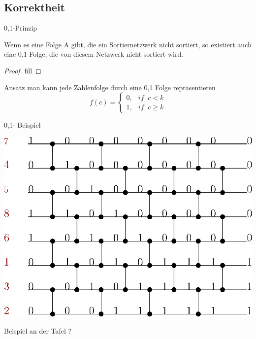 \documentclass[ucs,9pt]{beamer}
\begin{document}
\subsection{Korrektheit}
\begin{frame}{0,1-Prinzip}
\begin{theorem} 
Wenn es eine Folge A gibt, die ein Sortiernetzwerk nicht sortiert, so existiert auch eine 0,1-Folge, die von diesem Netzwerk nicht sortiert wird.
\end{theorem}
\begin{proof}
{\color{red} fill}
\end{proof}
\end{frame}

\begin{frame}{Ansatz}
    man kann jede Zahlenfolge durch eine 0,1 Folge repräsentieren
    $$
    f(c) = \begin{cases} 0 , & if \;\;c < k \\
    1 , & if \;\;c \geq k
    \end{cases}$$
\end{frame}

\begin{frame}{0,1- Beispiel}
\begin{semiverbatim}
 {
\begin{center}
\includegraphics[scale=0.8]{01beispiel.eps}
\end{center}
}
 {\begin{center} {\color{green}Beispiel an der Tafel ?}\end{center} }
\end{semiverbatim}
\end{frame}
\end{document}
